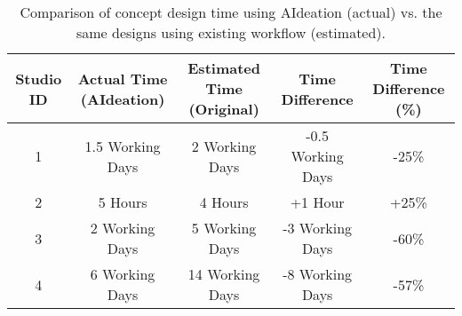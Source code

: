 \begin{table*}[t]
\centering
\footnotesize
\begin{tabular}{|c|c|c|c|c|}
\hline
Studio ID & Actual Time (AIdeation) & Estimated Time (Original) & Time Difference & Time Difference (\%) \\
\hline
1 & 1.5 Working Days & 2 Working Days & -0.5 Working Days & -25\% \\
\hline
2 & 5 Hours & 4 Hours & +1 Hour & +25\% \\
\hline
3 & 2 Working Days & 5 Working Days & -3 Working Days & -60\% \\
\hline
4 & 6 Working Days & 14 Working Days & -8 Working Days & -57\% \\
\hline
\end{tabular}

\caption{Comparison of concept design time using AIdeation (actual) vs. the same designs using existing workflow (estimated).}

\end{table*}

